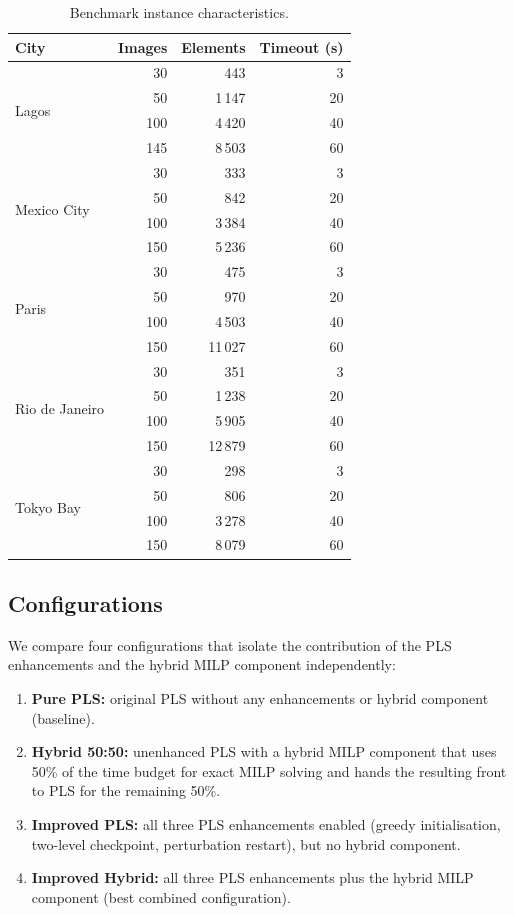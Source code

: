 \documentclass[11pt,a4paper]{article}
\begin{document}
\begin{table}[t]
\centering
\caption{Benchmark instance characteristics.}\label{tab:instances}
\begin{tabular}{lrrr}
\toprule
\textbf{City} & \textbf{Images} & \textbf{Elements} & \textbf{Timeout (s)} \\
\midrule
\multirow{4}{*}{Lagos}
  & 30  &    443  &   3 \\
  & 50  &  1\,147 &  20 \\
  & 100 &  4\,420 &  40 \\
  & 145 &  8\,503 &  60 \\
\midrule
\multirow{4}{*}{Mexico City}
  & 30  &    333  &   3 \\
  & 50  &    842  &  20 \\
  & 100 &  3\,384 &  40 \\
  & 150 &  5\,236 &  60 \\
\midrule
\multirow{4}{*}{Paris}
  & 30  &    475  &   3 \\
  & 50  &    970  &  20 \\
  & 100 &  4\,503 &  40 \\
  & 150 & 11\,027 &  60 \\
\midrule
\multirow{4}{*}{Rio de Janeiro}
  & 30  &    351  &   3 \\
  & 50  &  1\,238 &  20 \\
  & 100 &  5\,905 &  40 \\
  & 150 & 12\,879 &  60 \\
\midrule
\multirow{4}{*}{Tokyo Bay}
  & 30  &    298  &   3 \\
  & 50  &    806  &  20 \\
  & 100 &  3\,278 &  40 \\
  & 150 &  8\,079 &  60 \\
\bottomrule
\end{tabular}
\end{table}

\subsection{Configurations}

We compare four configurations that isolate the contribution of the PLS
enhancements and the hybrid MILP component independently:
\begin{enumerate}[nosep]
  \item \textbf{Pure PLS:} original PLS without any enhancements or hybrid
    component (baseline).
  \item \textbf{Hybrid 50:50:} unenhanced PLS with a hybrid MILP component
    that uses 50\% of the time budget for exact MILP solving and hands
    the resulting front to PLS for the remaining 50\%.
  \item \textbf{Improved PLS:} all three PLS enhancements enabled (greedy
    initialisation, two-level checkpoint, perturbation restart), but no
    hybrid component.
  \item \textbf{Improved Hybrid:} all three PLS enhancements plus the
    hybrid MILP component (best combined configuration).
\end{enumerate}
\end{document}
